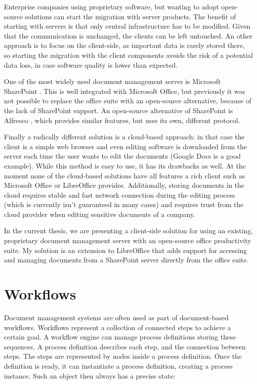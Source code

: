 Enterprise companies using proprietary software, but wanting to adopt
open-source solutions can start the migration with server products. The benefit
of starting with servers is that only central infrastructure has to be
modified. Given that the communication is unchanged, the clients can be left
untouched. An other approach is to focus on the client-side, as important data
is rarely stored there, so starting the migration with the client components
avoids the risk of a potential data loss, in case software quality is lower
than expected.

One of the most widely used document management server is Microsoft
SharePoint \cite{sharepoint}. This is well integrated with Microsoft Office, but
previously it was not possible to replace the office suite with an open-source
alternative, because of the lack of SharePoint support. An open-source
alternative of SharePoint is Alfresco \cite{alfresco}, which provides similar
features, but uses its own, different protocol.

Finally a radically different solution is a cloud-based approach: in that case
the client is a simple web browser and even editing software is downloaded from
the server each time the user wants to edit the documents (Google
Docs \cite{google-docs} is a good example). While this method is easy to use, it
has its drawbacks as well. At the moment none of the cloud-based solutions have
all features a rich client such as Microsoft Office or LibreOffice provides.
Additionally, storing documents in the cloud requires stable and fast network
connection during the editing process (which is currently isn't guaranteed in many
cases) and requires trust from the cloud provider when editing sensitive
documents of a company.

In the current thesis, we are presenting a client-side solution for using an
existing, proprietary document management server with an open-source office
productivity suite. My solution is an extension to LibreOffice that adds
support for accessing and managing documents from a SharePoint server directly
from the office suite.

\section{Workflows}

Document management systems are often used as part of document-based workflows.
Workflows represent a collection of connected steps to achieve a certain goal.
A workflow engine can manage process definitions storing these sequences. A
process definition describes each step, and the connection between steps. The
steps are represented by nodes inside a process definition. Once the definition
is ready, it can instantiate a process definition, creating a process instance.
Such an object then always has a precise state:

